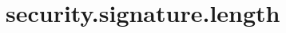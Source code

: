 \section{security.signature.length}
\label{configuration:SecuritySignatureLength}
\AvailableInJavaOnly{\TODO}